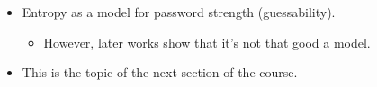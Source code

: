 \begin{frame}
  \begin{example}
    \begin{itemize}
      \item Entropy as a model for password strength (guessability).
        \begin{itemize}
          \item However, later works show that it's not that good a model.
        \end{itemize}
    \end{itemize}
  \end{example}

  \begin{remark}
    \begin{itemize}
      \item This is the topic of the next section of the course.
    \end{itemize}
  \end{remark}
\end{frame}

